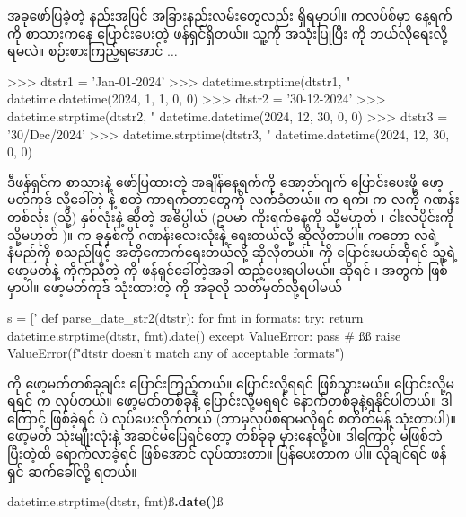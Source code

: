 အခုဖော်ပြခဲ့တဲ့ နည်းအပြင် အခြားနည်းလမ်းတွေလည်း ရှိရမှာပါ။  ကလပ်စ်မှာ နေ့ရက်ကို စာသားကနေ  ပြောင်းပေးတဲ့  ဖန်ရှင်ရှိတယ်။ သူ့ကို အသုံးပြုပြီး  ကို ဘယ်လိုရေးလို့ ရမလဲ။ စဉ်းစားကြည့်ရအောင် $\ldots$

\begin{codetxt}
>>> dtstr1 = 'Jan-01-2024'
>>> datetime.strptime(dtstr1, "%
datetime.datetime(2024, 1, 1, 0, 0)
>>> dtstr2 = '30-12-2024'
>>> datetime.strptime(dtstr2, "%
datetime.datetime(2024, 12, 30, 0, 0)
>>> dtstr3 = '30/Dec/2024'
>>> datetime.strptime(dtstr3, "%
datetime.datetime(2024, 12, 30, 0, 0)
\end{codetxt}
ဒီဖန်ရှင်က စာသားနဲ့ ဖော်ပြထားတဲ့ အချိန်နေ့ရက်ကို  အော့ဘ်ဂျက် ပြောင်းပေးဖို့ ဖော့မတ်ကုဒ်  လို့ခေါ်တဲ့ \fCode{\%} နဲ့ စတဲ့ ကာရက်တာတွေကို လက်ခံတယ်။  က ရက်၊  က   လကို ဂဏန်း တစ်လုံး (သို့) နှစ်လုံးနဲ့ ဆိုတဲ့ အဓိပ္ပါယ် (ဥပမာ ကိုးရက်နေ့ကို  သို့မဟုတ် ၊ ငါးလပိုင်းကို  သို့မဟုတ် )။  က ခုနှစ်ကို ဂဏန်းလေးလုံးနဲ့ ရေးတယ်လို့ ဆိုလိုတာပါ။  ကတော့ လရဲ့ နံမည်ကို  စသည်ဖြင့် အတိုကောက်ရေးတယ်လို့ ဆိုလိုတယ်။  ကို ပြောင်းမယ်ဆိုရင် သူ့ရဲ့ဖော့မတ်နဲ့ ကိုက်ညီတဲ့  ကို ဖန်ရှင်ခေါ်တဲ့အခါ ထည့်ပေးရပါမယ်။  ဆိုရင် ၊  အတွက်  ဖြစ်မှာပါ။ ဖော့မတ်ကုဒ် သုံးထားတဲ့  ကို အခုလို သတ်မှတ်လို့ရပါမယ်
%
\begin{py}
s = ['%
def parse_date_str2(dtstr):
    for fmt in formats:
        try:
            return datetime.strptime(dtstr, fmt).date()
        except ValueError:
            pass
    # ßß
    raise ValueError(f"{dtstr} doesn't match any of acceptable formats")
\end{py}
%
 ကို ဖော့မတ်တစ်ခုချင်း ပြောင်းကြည့်တယ်။ ပြောင်းလို့ရရင်  ဖြစ်သွားမယ်။ ပြောင်းလို့မရရင်  က   လုပ်တယ်။  ဖော့မတ်တစ်ခုနဲ့ ပြောင်းလို့မရရင် နောက်တစ်ခုနဲ့ရနိုင်ပါတယ်။ ဒါကြောင့်  ဖြစ်ခဲ့ရင်   ပဲ လုပ်ပေးလိုက်တယ် (ဘာမှလုပ်စရာမလိုရင်  စတိတ်မန့် သုံးတာပါ)။ ဖော့မတ် သုံးမျိုးလုံးနဲ့ အဆင်မပြေရင်တော့ တစ်ခုခု မှားနေလို့ပဲ။ ဒါကြောင့်  မဖြစ်ဘဲ   ပြီးတဲ့ထိ ရောက်လာခဲ့ရင်   ဖြစ်အောင်  လုပ်ထားတာ။  ပြန်ပေးတာက  ပါ။  လိုချင်ရင်  ဖန်ရှင် ဆက်ခေါ်လို့ ရတယ်။ 
%
\begin{py}
datetime.strptime(dtstr, fmt)ß\textbf{.date()}ß
\end{py}
%

